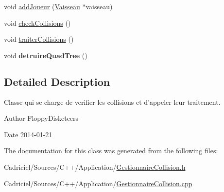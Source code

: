 \begin{DoxyCompactItemize}
\item 
void \hyperlink{group__inf2990_ga6b1e1b31aa559c75d0cb6314620aef7b}{add\-Joueur} (\hyperlink{class_vaisseau}{Vaisseau} $\ast$vaisseau)
\item 
void \hyperlink{group__inf2990_ga34d26483935d731acb183b073f0641e4}{check\-Collisions} ()
\item 
void \hyperlink{group__inf2990_gab1e397ffc039f85112a7a177fb0219f3}{traiter\-Collisions} ()
\item 
\hypertarget{group__inf2990_ga9d33a33cd08ac039ff71c43976397d38}{void {\bfseries detruire\-Quad\-Tree} ()}\label{group__inf2990_ga9d33a33cd08ac039ff71c43976397d38}

\end{DoxyCompactItemize}


\subsection{Detailed Description}
Classe qui se charge de verifier les collisions et d'appeler leur traitement. 

\begin{DoxyAuthor}{Author}
Floppy\-Disketeers 
\end{DoxyAuthor}
\begin{DoxyDate}{Date}
2014-\/01-\/21 
\end{DoxyDate}


The documentation for this class was generated from the following files\-:\begin{DoxyCompactItemize}
\item 
Cadriciel/\-Sources/\-C++/\-Application/\hyperlink{_gestionnaire_collision_8h}{Gestionnaire\-Collision.\-h}\item 
Cadriciel/\-Sources/\-C++/\-Application/\hyperlink{_gestionnaire_collision_8cpp}{Gestionnaire\-Collision.\-cpp}\end{DoxyCompactItemize}
